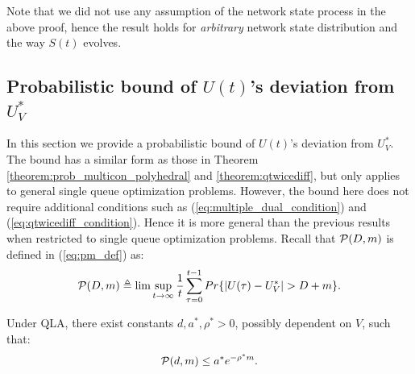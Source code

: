 \documentclass[journal]{IEEEtran}
\newcommand{\prob}{Pr}
\newcommand{\script}[1]{{{\cal{#1} }}}
\begin{document}
Note that we did not use any assumption of the network state process in the above proof, hence   the result holds for \emph{arbitrary} network state distribution and the way $S(t)$ evolves. 

\subsection{Probabilistic bound of $U(t)$'s deviation from $U^*_V$}
In this section we provide a probabilistic bound of $U(t)$'s deviation from $U_V^*$. The bound has a similar form as those in Theorem \ref{theorem:prob_multicon_polyhedral} and \ref{theorem:qtwicediff}, but only applies to general single queue optimization problems. However, the bound here does not require additional conditions such as (\ref{eq:multiple_dual_condition}) and (\ref{eq:qtwicediff_condition}). Hence it is more general than the previous results when restricted to single queue optimization problems. 
Recall that $\script{P}(D,m)$ is defined in (\ref{eq:pm_def}) as:
\begin{eqnarray*}
\script{P}(D, m)\triangleq\lim\sup_{t\rightarrow\infty}\frac{1}{t}\sum_{\tau=0}^{t-1}\prob\{|U(\tau)-U_V^*|>D+m\}.
\end{eqnarray*}

\begin{thm}\label{theorem:prob_singlecon}
Under QLA, there exist constants $d,a^*, \rho^*>0$, possibly dependent on $V$, such that:
\begin{eqnarray}
\script{P}(d,m)\leq a^* e^{-\rho^*m}.\label{eq:pm_ineq_r1}
\end{eqnarray}
\end{thm}
\end{document}
